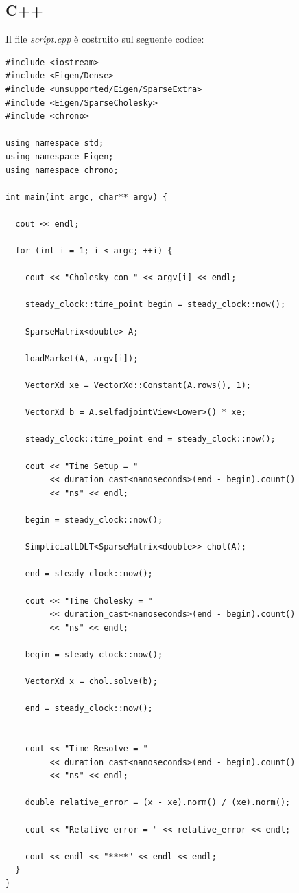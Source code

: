 \documentclass[preprint,12pt]{elsarticle}
\begin{document}
\newpage

\subsection{C++}

Il file \textit{script.cpp} è costruito sul seguente codice:

\begin{verbatim}
#include <iostream>
#include <Eigen/Dense>
#include <unsupported/Eigen/SparseExtra>
#include <Eigen/SparseCholesky>
#include <chrono>

using namespace std;
using namespace Eigen;
using namespace chrono;

int main(int argc, char** argv) {	

  cout << endl;

  for (int i = 1; i < argc; ++i) {

    cout << "Cholesky con " << argv[i] << endl;		
    
    steady_clock::time_point begin = steady_clock::now();

    SparseMatrix<double> A;

    loadMarket(A, argv[i]);

    VectorXd xe = VectorXd::Constant(A.rows(), 1);

    VectorXd b = A.selfadjointView<Lower>() * xe;

    steady_clock::time_point end = steady_clock::now();

    cout << "Time Setup = " 
         << duration_cast<nanoseconds>(end - begin).count() 
         << "ns" << endl;
         
    begin = steady_clock::now();

    SimplicialLDLT<SparseMatrix<double>> chol(A);

    end = steady_clock::now();
    
    cout << "Time Cholesky = " 
         << duration_cast<nanoseconds>(end - begin).count()
         << "ns" << endl;
         
    begin = steady_clock::now();

    VectorXd x = chol.solve(b);
    
    end = steady_clock::now();

  
    cout << "Time Resolve = " 
         << duration_cast<nanoseconds>(end - begin).count() 
         << "ns" << endl;

    double relative_error = (x - xe).norm() / (xe).norm();

    cout << "Relative error = " << relative_error << endl;

    cout << endl << "****" << endl << endl;
  }
}
\end{verbatim}
\end{document}
